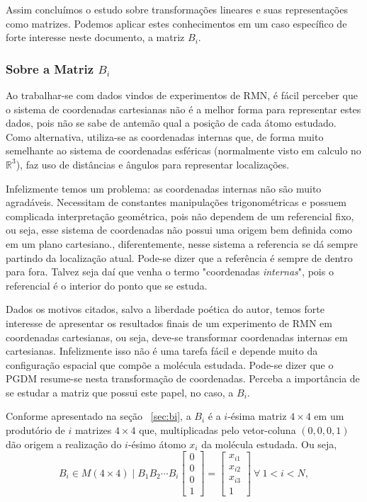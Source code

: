 \documentclass[a4paper,12pt]{article}
\begin{document}
	Assim concluímos o estudo sobre transformações lineares e suas representações como matrizes. Podemos aplicar estes conhecimentos em um caso específico de forte interesse neste documento, a matriz $B_i$.
	
	\subsubsection*{Sobre a Matriz $B_i$}
	
	Ao trabalhar-se com dados vindos de experimentos de RMN, é fácil perceber que o sistema de coordenadas cartesianas não é a melhor forma para representar estes dados, pois não se sabe de antemão qual a posição de cada átomo estudado. Como alternativa, utiliza-se as coordenadas internas que, de forma muito semelhante ao sistema de coordenadas esféricas (normalmente visto em calculo no $\mathbb{R}^3$), faz uso de distâncias e ângulos para representar localizações. 
	
	Infelizmente temos um problema: as coordenadas internas não são muito agradáveis. Necessitam de constantes manipulações trigonométricas e possuem complicada interpretação geométrica, pois não dependem de um referencial fixo, ou seja, esse sistema de coordenadas não possui uma origem bem definida como em um plano cartesiano., diferentemente, nesse sistema a referencia se dá sempre partindo da localização atual. Pode-se dizer que a referência é sempre de dentro para fora. Talvez seja daí que venha o termo "coordenadas \textit{internas}", pois o referencial é o interior do ponto que se estuda. 
	
	 Dados os motivos citados, salvo a liberdade poética do autor, temos forte interesse de apresentar os resultados finais de um experimento de RMN em coordenadas cartesianas, ou seja, deve-se transformar coordenadas internas em cartesianas. Infelizmente isso não é uma tarefa fácil e depende muito da configuração espacial que compõe a molécula estudada. Pode-se dizer que o PGDM resume-se nesta transformação de coordenadas. Perceba a importância de se estudar a matriz que possui este papel, no caso, a $B_i$.
	 
	 Conforme apresentado na seção ~\ref{sec:bi}, a $B_i$ é a $i$-ésima matriz $4\times 4$ em um produtório de $i$ matrizes $4\times 4$ que, multiplicadas pelo vetor-coluna $(0,0,0,1)$ dão origem a realização do $i$-ésimo átomo $x_i$ da molécula estudada. Ou seja, 
	 $$ B_i \in M(4\times 4) \mid
	 B_{1}B_{2}\cdots B_{i}\begin{bmatrix}
	 0\\ 
	 0\\ 
	 0\\ 
	 1
	 \end{bmatrix}
	 = \begin{bmatrix}
	 x_{i1}\\ 
	 x_{i2}\\ 
	 x_{i3}\\ 
	 1
	 \end{bmatrix}
	 \:\forall\:  1< i < N,
	 $$
	 
\end{document}
